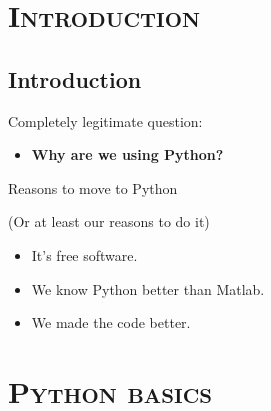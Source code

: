 \documentclass[xcolor=x11names, compress,handout]{beamer}
\renewcommand{\(}{\begin{columns}}
\renewcommand{\)}{\end{columns}}
\newcommand{\<}[1]{\begin{column}{#1}}
\renewcommand{\>}{\end{column}}
\begin{document}
\section{ \scshape Introduction}
\subsection{Introduction}
\begin{frame}{}
\large

Completely legitimate question:

\vfill
\pause

\begin{itemize}
  \item \textbf{\Large Why are we using Python?}
\end{itemize}

\vfill

\end{frame}

\begin{frame}{Reasons to move to Python}

  (Or at least our reasons to do it)

  \begin{itemize}
    \Large
    \newcommand{\myitem}{\vfill \pause \item[{\color{darkgreen}\checkmark}]}
    \myitem It's free software.
    \myitem We know Python better than Matlab.
    \myitem We made the code better.
  \end{itemize}

\end{frame}


\section{\scshape Python basics}
\end{document}
